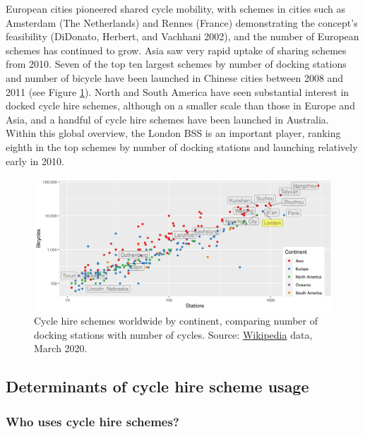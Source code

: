 \documentclass[
]{article}
\begin{document}
European cities pioneered shared cycle mobility, with schemes in cities such as Amsterdam (The Netherlands) and Rennes (France) demonstrating the concept's feasibility (DiDonato, Herbert, and Vachhani 2002), and the number of European schemes has continued to grow.
Asia saw very rapid uptake of sharing schemes from 2010. Seven of the top ten largest schemes by number of docking stations and number of bicycle have been launched in Chinese cities between 2008 and 2011 (see Figure \ref{fig:global-stations-cycles}).
North and South America have seen substantial interest in docked cycle hire schemes, although on a smaller scale than those in Europe and Asia, and a handful of cycle hire schemes have been launched in Australia.
Within this global overview, the London BSS is an important player, ranking eighth in the top schemes by number of docking stations and launching relatively early in 2010.



\begin{figure}[h]

{\centering \includegraphics[width=0.8\linewidth]{figures/bikehshare-global-stations-bicycles} 

}

\caption{Cycle hire schemes worldwide by continent, comparing number of docking stations with number of cycles. Source: \href{https://en.wikipedia.org/wiki/List_of_bicycle-sharing_systems}{Wikipedia} data, March 2020.}\label{fig:global-stations-cycles}
\end{figure}

\hypertarget{determinants-of-cycle-hire-scheme-usage}{%
\subsection{Determinants of cycle hire scheme usage}\label{determinants-of-cycle-hire-scheme-usage}}

\hypertarget{who-uses-cycle-hire-schemes}{%
\subsubsection{Who uses cycle hire schemes?}\label{who-uses-cycle-hire-schemes}}
\end{document}
